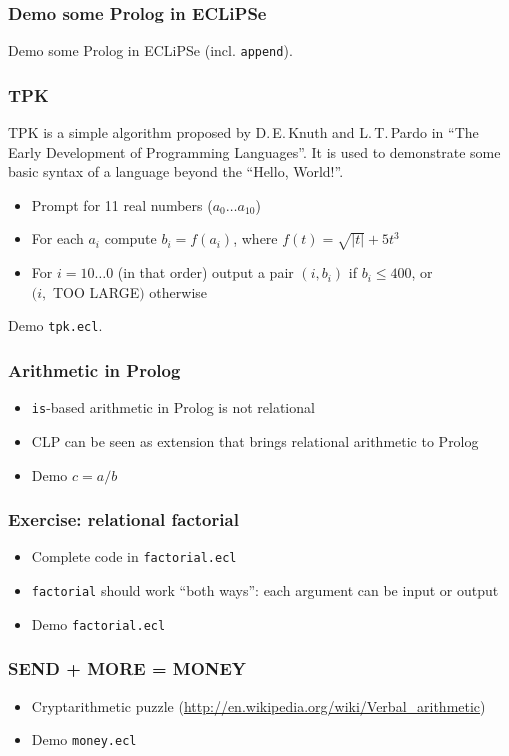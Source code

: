 \documentclass{beamer}
\begin{document}
\begin{frame}
\frametitle{Demo some Prolog in ECLiPSe}
Demo some Prolog in ECLiPSe (incl. \texttt{append}).
\end{frame}

\begin{frame}
\frametitle{TPK}
TPK is a simple algorithm proposed by D.\,E.\,Knuth and L.\,T.\,Pardo in ``The Early Development
of Programming Languages''. It is used to demonstrate some basic syntax of a language beyond the ``Hello, World!''.
\begin{itemize}
\item Prompt for 11 real numbers ($a_0 \dots a_{10}$)
\item For each $a_i$ compute $b_i = f(a_i)$, where $f(t) = \sqrt{|t|} + 5 {t}^3$
\item For $i = 10 \dots 0$ (in that order) output a pair $(i, b_i)$ if $b_i \leq 400$, or \\$(i,$ TOO LARGE$)$ otherwise
\end{itemize}
Demo \texttt{tpk.ecl}.
\end{frame}

\begin{frame}
\frametitle{Arithmetic in Prolog}
\begin{itemize}
\item \texttt{is}-based arithmetic in Prolog is not relational
\item CLP can be seen as extension that brings relational arithmetic to Prolog
\item Demo $c = a / b$
\end{itemize}
\end{frame}


\begin{frame}
\frametitle{Exercise: relational factorial}
\begin{itemize}
\item Complete code in \texttt{factorial.ecl}
\item \texttt{factorial} should work ``both ways'': each argument can be input or output
\item Demo \texttt{factorial.ecl}
\end{itemize}
\end{frame}

\begin{frame}
\frametitle{SEND + MORE = MONEY}
\begin{itemize}
\item Cryptarithmetic puzzle (\url{http://en.wikipedia.org/wiki/Verbal_arithmetic})
\item Demo \texttt{money.ecl}
\end{itemize}
\end{frame}
\end{document}
